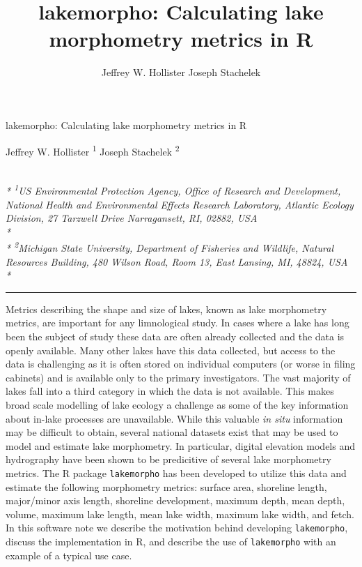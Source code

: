 \documentclass[11pt,]{article}
\title{lakemorpho: Calculating lake morphometry metrics in R}
\author{
Jeffrey W. Hollister
Joseph Stachelek
}
\date{}
\begin{document}
\begin{singlespace}
\begin{center}
\huge lakemorpho: Calculating lake morphometry metrics in R
\end{center}
\begin{center}
\large
Jeffrey W. Hollister \textsuperscript{1} 
Joseph Stachelek \textsuperscript{2} 
\end{center}
\begin{justify}
\footnotesize \emph{ 
\\*
\textsuperscript{1}US Environmental Protection Agency, Office of Research and Development,
National Health and Environmental Effects Research Laboratory, Atlantic
Ecology Division, 27 Tarzwell Drive Narragansett, RI, 02882, USA\\*
\\*
\textsuperscript{2}Michigan State University, Department of Fisheries and Wildlife, Natural
Resources Building, 480 Wilson Road, Room 13, East Lansing, MI, 48824,
USA\\*
}
\setcounter{num}{1}
\\[0.1cm]
\footnotesize \emph{ 
}
\end{justify}
\normalsize

\end{singlespace}


\singlespace

\vspace{2mm}

\hrule

Metrics describing the shape and size of lakes, known as lake
morphometry metrics, are important for any limnological study. In cases
where a lake has long been the subject of study these data are often
already collected and the data is openly available. Many other lakes
have this data collected, but access to the data is challenging as it is
often stored on individual computers (or worse in filing cabinets) and
is available only to the primary investigators. The vast majority of
lakes fall into a third category in which the data is not available.
This makes broad scale modelling of lake ecology a challenge as some of
the key information about in-lake processes are unavailable. While this
valuable \emph{in situ} information may be difficult to obtain, several
national datasets exist that may be used to model and estimate lake
morphometry. In particular, digital elevation models and hydrography
have been shown to be predicitive of several lake morphometry metrics.
The R package \texttt{lakemorpho} has been developed to utilize this
data and estimate the following morphometry metrics: surface area,
shoreline length, major/minor axis length, shoreline development,
maximum depth, mean depth, volume, maximum lake length, mean lake width,
maximum lake width, and fetch. In this software note we describe the
motivation behind developing \texttt{lakemorpho}, discuss the
implementation in R, and describe the use of \texttt{lakemorpho} with an
example of a typical use case.
\end{document}
